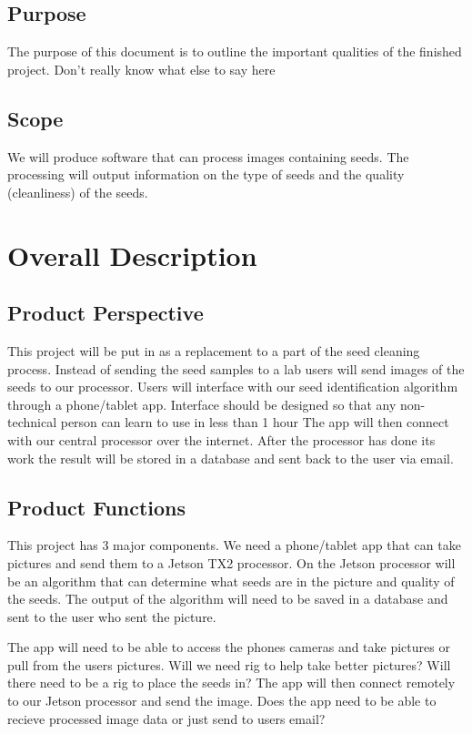\documentclass[onecolumn, draftclsnofoot,10pt, compsoc]{IEEEtran}
\begin{document}
\subsection{Purpose}
The purpose of this document is to outline the important qualities of the finished project.
Don't really know what else to say here

\subsection{Scope}
We will produce software that can process images containing seeds.
The processing will output information on the type of seeds and the quality (cleanliness) of the seeds.

\section{Overall Description}
\subsection{Product Perspective}
This project will be put in as a replacement to a part of the seed cleaning process.
Instead of sending the seed samples to a lab users will send images of the seeds to our processor.
Users will interface with our seed identification algorithm through a phone/tablet app.
Interface should be designed so that any non-technical person can learn to use in less than 1 hour
The app will then connect with our central processor over the internet.
After the processor has done its work the result will be stored in a database and sent back
to the user via email.

\subsection{Product Functions}
This project has 3 major components.
We need a phone/tablet app that can take pictures and send them to a Jetson TX2 processor.
On the Jetson processor will be an algorithm that can determine what seeds are in the picture and quality of the seeds.
The output of the algorithm will need to be saved in a database and sent to the user who sent the picture.

The app will need to be able to access the phones cameras and take pictures or pull from the users pictures.
Will we need rig to help take better pictures?
Will there need to be a rig to place the seeds in?
The app will then connect remotely to our Jetson processor and send the image.
Does the app need to be able to recieve processed image data or just send to users email?
\end{document}
